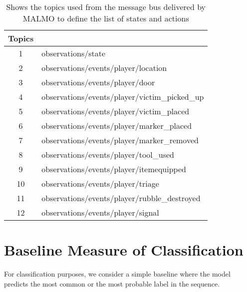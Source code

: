 \documentclass{article}
\begin{document}
\begin{table}[h!]
    \centering
    \begin{tabular}{|c|l|}
    \hline
    \textbf{Topics} \\[1em]
    \hline
    1 & observations/state \\[0.5em]
    2 & observations/events/player/location \\[0.5em]
    3 & observations/events/player/door \\[0.5em]
    4 & observations/events/player/victim\_picked\_up \\[0.5em]
    5 & observations/events/player/victim\_placed \\[0.5em]
    6 & observations/events/player/marker\_placed \\[0.5em]
    7 & observations/events/player/marker\_removed \\[0.5em]
    8 & observations/events/player/tool\_used \\[0.5em]
    9 & observations/events/player/itemequipped \\[0.5em]
    10 & observations/events/player/triage \\[0.5em] 
    11 & observations/events/player/rubble\_destroyed \\[0.5em]
    12 & observations/events/player/signal \\[0.5em]
    \hline
    \end{tabular}
    \caption{Shows the topics used from the message bus delivered by MALMO 
    to define the list of states and actions}
    \label{table:2}
\end{table}


\section*{Baseline Measure of Classification}
For classification purposes, we consider a simple baseline where the model predicts
the most common or the most probable label in the sequence.

\printbibliography 
\end{document}
